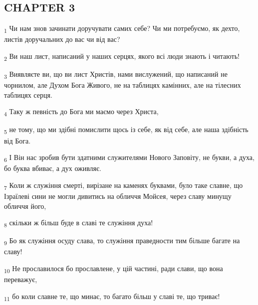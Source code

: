\subsection{CHAPTER 3}
\begin{tcolorbox}
\textsubscript{1} Чи нам знов зачинати доручувати самих себе? Чи ми потребуємо, як дехто, листів доручальних до вас чи від вас?
\end{tcolorbox}
\begin{tcolorbox}
\textsubscript{2} Ви наш лист, написаний у наших серцях, якого всі люди знають і читають!
\end{tcolorbox}
\begin{tcolorbox}
\textsubscript{3} Виявляєте ви, що ви лист Христів, нами вислужений, що написаний не чорнилом, але Духом Бога Живого, не на таблицях камінних, але на тілесних таблицях серця.
\end{tcolorbox}
\begin{tcolorbox}
\textsubscript{4} Таку ж певність до Бога ми маємо через Христа,
\end{tcolorbox}
\begin{tcolorbox}
\textsubscript{5} не тому, що ми здібні помислити щось із себе, як від себе, але наша здібність від Бога.
\end{tcolorbox}
\begin{tcolorbox}
\textsubscript{6} І Він нас зробив бути здатними служителями Нового Заповіту, не букви, а духа, бо буква вбиває, а дух оживляє.
\end{tcolorbox}
\begin{tcolorbox}
\textsubscript{7} Коли ж служіння смерті, вирізане на каменях буквами, було таке славне, що Ізраїлеві сини не могли дивитись на обличчя Мойсея, через славу минущу обличчя його,
\end{tcolorbox}
\begin{tcolorbox}
\textsubscript{8} скільки ж більш буде в славі те служіння духа!
\end{tcolorbox}
\begin{tcolorbox}
\textsubscript{9} Бо як служіння осуду слава, то служіння праведности тим більше багате на славу!
\end{tcolorbox}
\begin{tcolorbox}
\textsubscript{10} Не прославилося бо прославлене, у цій частині, ради слави, що вона переважує,
\end{tcolorbox}
\begin{tcolorbox}
\textsubscript{11} бо коли славне те, що минає, то багато більш у славі те, що триває!
\end{tcolorbox}
